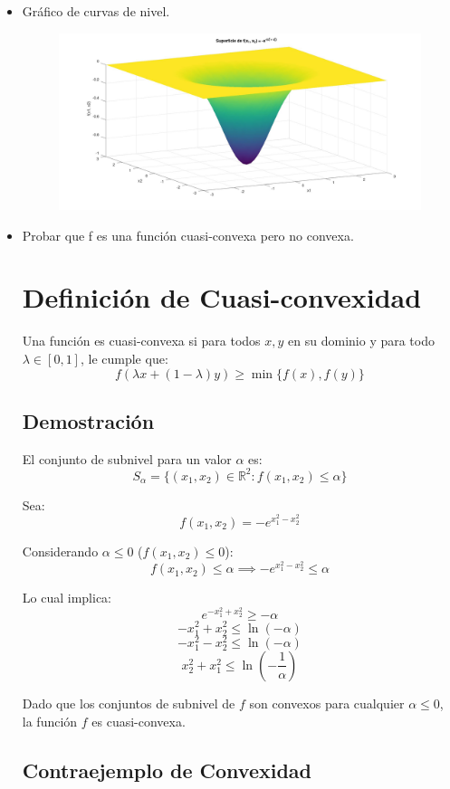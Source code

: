 \documentclass[11pt]{article}
\begin{document}
\begin{itemize}
    \item Gráfico de curvas de nivel.
    \begin{figure}[h]
    \centering
    \includegraphics[width=\linewidth]{figuras/grafico.jpg}
\end{figure}

    \item Probar que f es una función cuasi-convexa pero no convexa.
    \section*{Definición de Cuasi-convexidad}

Una función es cuasi-convexa si para todos $x, y$ en su dominio y para todo $\lambda \in [0,1]$, le cumple que:
\[ f(\lambda x + (1-\lambda) y) \geq \min\{f(x), f(y)\} \]

\subsection*{Demostración}

El conjunto de subnivel para un valor $\alpha$ es:
\[ S_\alpha = \{(x_1, x_2) \in \mathbb{R}^2 : f(x_1, x_2) \leq \alpha \} \]

Sea:
\[ f(x_1, x_2) = -e^{x_1^2 - x_2^2} \]

Considerando $\alpha \leq 0$ ($f(x_1, x_2) \leq 0$):
\[ f(x_1, x_2) \leq \alpha \implies -e^{x_1^2 - x_2^2} \leq \alpha \]

Lo cual implica:
\[ e^{-x_1^2 + x_2^2} \geq -\alpha \]
\[ -x_1^2 + x_2^2 \leq \ln(-\alpha) \]
\[ -x_1^2 - x_2^2 \leq \ln(-\alpha) \]
\[ x_2^2 + x_1^2 \leq \ln(-\frac{1}{\alpha}) \]

Dado que los conjuntos de subnivel de $f$ son convexos para cualquier $\alpha \leq 0$, la función $f$ es cuasi-convexa.

\subsection*{Contraejemplo de Convexidad}


\end{itemize}
\end{document}
